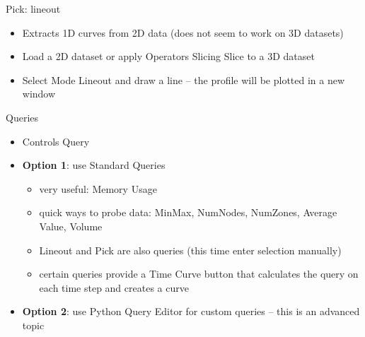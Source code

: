 \begin{frame}{Pick: lineout}
  \begin{itemize}\setlength{\itemsep}{2mm}
  \item Extracts 1D curves from 2D data (does not seem to work on 3D datasets)
  \item Load a 2D dataset or apply Operators \ra Slicing \ra Slice to a 3D dataset
  \item Select Mode \ra Lineout and draw a line -- the profile will be plotted in a new window
  \end{itemize}
\end{frame}

\begin{frame}{Queries}
  \begin{itemize}\setlength{\itemsep}{2mm}
  \item Controls \ra Query
  \item {\bf Option 1}: use Standard Queries
    \begin{itemize}\setlength{\itemsep}{0mm}
    \item very useful: Memory Usage
    \item quick ways to probe data: MinMax, NumNodes, NumZones, Average Value, Volume
    \item Lineout and Pick are also queries (this time enter selection manually)
    \item certain queries provide a Time Curve button that calculates the query on each time step and
      creates a curve
    \end{itemize}
  \item {\bf Option 2}: use Python Query Editor for custom queries -- this is an advanced topic
  \end{itemize}
\end{frame}

